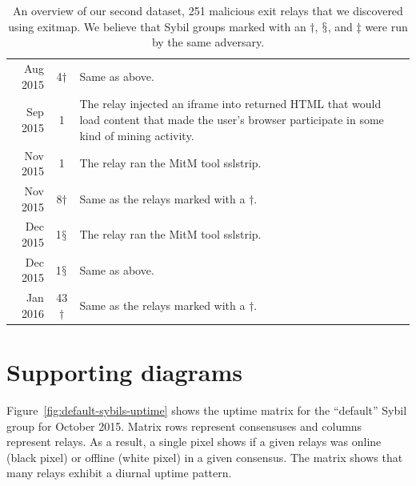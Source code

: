 \begin{table}
\begin{tabularx}{\textwidth}{r c X}
Aug 2015 & 4$\dagger$ & Same as above. \\

Sep 2015 & 1 & The relay injected an iframe into returned HTML that would load
content that made the user's browser participate in some kind of mining
activity. \\

Nov 2015 & 1 & The relay ran the MitM tool sslstrip. \\

Nov 2015 & 8$\dagger$ & Same as the relays marked with a $\dagger$. \\

Dec 2015 & 1$\mathsection$ & The relay ran the MitM tool sslstrip. \\

Dec 2015 & 1$\mathsection$ & Same as above. \\

Jan 2016 & 43$\dagger$ & Same as the relays marked with a $\dagger$. \\
\hline
\end{tabularx}
\caption{An overview of our second dataset, 251 malicious exit relays that we
discovered using exitmap.  We believe that Sybil groups marked with an
$\dagger$, $\mathsection$, and $\ddagger$ were run by the same adversary.}
\label{tab:exitmap-dataset}
\end{table}

\section{Supporting diagrams}
Figure~\ref{fig:default-sybils-uptime} shows the uptime matrix for the
``default'' Sybil group for October 2015.  Matrix rows represent consensuses and
columns represent relays.  As a result, a single pixel shows if a given relays
was online (black pixel) or offline (white pixel) in a given consensus.  The
matrix shows that many relays exhibit a diurnal uptime pattern.

